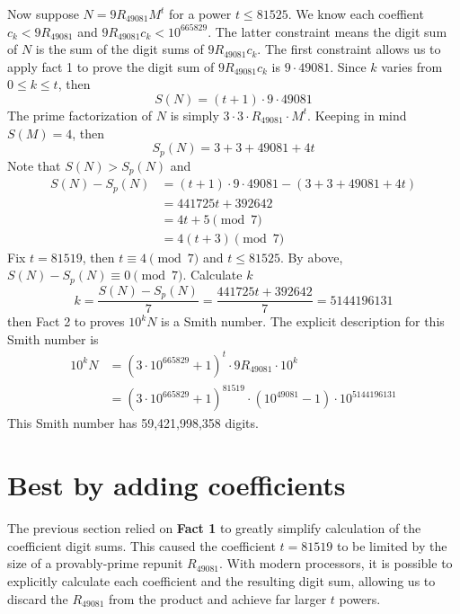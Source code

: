\documentclass{amsart}
\newcommand{\RE}{{49081}}
\newcommand{\ME}{{665829}}
\numberwithin{equation}{section}
\theoremstyle{plain} %
\theoremstyle{definition}
\theoremstyle{remark}
\begin{document}
Now suppose $N = 9 R_{49081} M^t$ for a power $t\leq 81525$. We know each coeffient $c_k < 9R_{\RE}$ and $9 R_{\RE} c_k < 10^\ME$. The latter constraint means the digit sum of $N$ is the sum of the digit sums of $9 R_{49081} c_k$. The first constraint allows us to apply fact 1 to prove the digit sum of $ 9 R_{49081} c_k$ is $9 \cdot 49081$. Since $k$ varies from $0 \leq k \leq t$, then
$$S(N) = (t+1) \cdot 9 \cdot 49081$$
The prime factorization of $N$ is simply $3\cdot 3 \cdot R_\RE \cdot M^t$. Keeping in mind $S(M) = 4$, then
$$S_p(N) = 3 + 3 + \RE + 4t$$
Note that $S(N) > S_p(N)$ and 
\begin{align*}
S(N) - S_p(N) &= (t+1) \cdot 9 \cdot \RE - (3 + 3 + \RE + 4t) \\
&= 441725 t + 392642 \\
&= 4t +5 \pmod{7}\\
&= 4(t +3) \pmod{7}
\end{align*}
Fix $t=81519$, then $t \equiv 4 \pmod{7}$ and $t \leq 81525$. By above, $S(N) - S_p(N) \equiv 0 \pmod{7}$. Calculate $k$
$$k = \frac{ S(N) - S_p(N)}{7} = \frac{441725 t + 392642}{7} = 5144196131$$
then Fact 2 to proves $10^k N$ is a Smith number. The explicit description for this Smith number is
\begin{align*}
10^k N &= (3\cdot 10^\ME + 1)^t \cdot 9R_\RE \cdot 10^k \\
&=  (3\cdot 10^\ME + 1)^{81519} \cdot (10 ^{49081} -1 ) \cdot 10^{ 5144196131}
\end{align*}
This Smith number has 59,421,998,358 digits.
\\ 
 \section{Best by adding coefficients}
The previous section relied on {\bf Fact 1} to greatly simplify calculation of the coefficient digit sums. This caused the coefficient $t=81519$ to be limited by the size of a provably-prime repunit $R_\RE$. With modern processors, it is possible to explicitly calculate each coefficient and the resulting digit sum, allowing us to discard the $R_\RE$ from the product and achieve far larger $t$ powers. 
\end{document}
